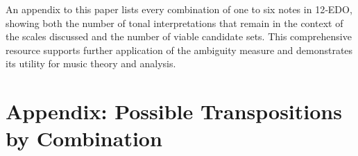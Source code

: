 \documentclass[10pt,twocolumn]{article}
\numberwithin{equation}{section} %
\begin{document}
    An appendix to this paper lists every combination of one to six notes in 12‑EDO, showing both the number of tonal interpretations that remain in the context of the scales discussed and the number of viable candidate sets.
    This comprehensive resource supports further application of the ambiguity measure and demonstrates its utility for music theory and analysis.

    \vfill\break
    
    

    \clearpage

    \newcommand{\sone}[1]{\cellcolor{gray!20}{#1}} %
    \newcommand{\diag}{\rowcolor{green!12}}        %

    \section*{Appendix: Possible Transpositions by Combination}

    \begingroup
    \footnotesize                           %

    \setlength{\aboverulesep}{0.3ex}
    \setlength{\belowrulesep}{0.3ex}

    \tablelasttail{\bottomrule}

    

    \endgroup
\end{document}
